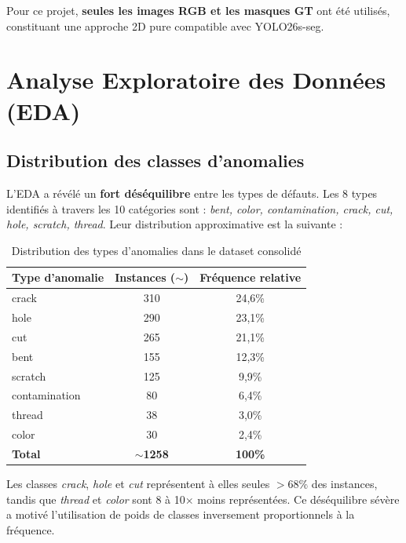 \documentclass[12pt, a4paper]{report}
\begin{document}
Pour ce projet, \textbf{seules les images RGB et les masques GT} ont été utilisés, constituant une approche 2D pure compatible avec YOLO26s-seg.

\section{Analyse Exploratoire des Données (EDA)}

\subsection{Distribution des classes d'anomalies}

L'EDA a révélé un \textbf{fort déséquilibre} entre les types de défauts. Les 8 types identifiés à travers les 10 catégories sont : \textit{bent, color, contamination, crack, cut, hole, scratch, thread}. Leur distribution approximative est la suivante :

\begin{table}[H]
  \centering
  \caption{Distribution des types d'anomalies dans le dataset consolidé}
  \label{tab:class_dist}
  \begin{tabular}{lcc}
    \toprule
    \rowcolor{themebluevlight}
    \textbf{Type d'anomalie} & \textbf{Instances ($\sim$)} & \textbf{Fréquence relative} \\
    \midrule
    crack         & 310 & 24,6\% \\
    hole          & 290 & 23,1\% \\
    cut           & 265 & 21,1\% \\
    bent          & 155 & 12,3\% \\
    scratch       & 125 & 9,9\%  \\
    contamination & 80  & 6,4\%  \\
    thread        & 38  & 3,0\%  \\
    color         & 30  & 2,4\%  \\
    \midrule
    \textbf{Total} & \textbf{$\sim$1258} & \textbf{100\%} \\
    \bottomrule
  \end{tabular}
\end{table}

\begin{notebox}
Les classes \textit{crack}, \textit{hole} et \textit{cut} représentent à elles seules $>68\%$ des instances, tandis que \textit{thread} et \textit{color} sont 8 à 10$\times$ moins représentées. Ce déséquilibre sévère a motivé l'utilisation de poids de classes inversement proportionnels à la fréquence.
\end{notebox}
\end{document}
